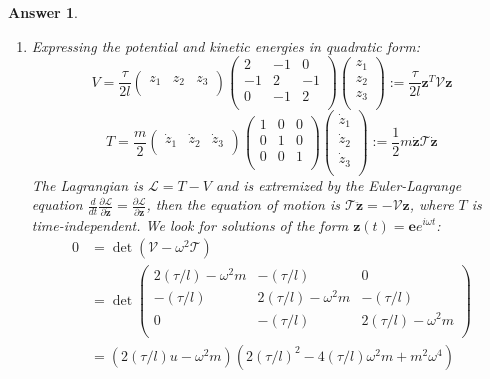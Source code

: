 \documentclass[a4paper]{article}
\newtheorem{ans}{Answer}[section]
\theoremstyle{new}
\begin{document}
\begin{ans}\leavevmode
\begin{enumerate}[label=(\roman*)]
\item Expressing the potential and kinetic energies in quadratic form:
$$V=\frac{\tau}{2l}\begin{pmatrix}z_1&z_2&z_3\\\end{pmatrix}\begin{pmatrix}2&-1&0\\-1&2&-1\\0&-1&2\\\end{pmatrix}\begin{pmatrix}z_1\\z_2\\z_3\\\end{pmatrix}:=\frac{\tau}{2l}\mathbf{z}^T\mathcal{V}\mathbf{z}$$
$$T=\frac{m}{2}\begin{pmatrix}\dot{z}_1&\dot{z}_2&\dot{z}_3\\\end{pmatrix}\begin{pmatrix}1&0&0\\0&1&0\\0&0&1\\\end{pmatrix}\begin{pmatrix}\dot{z}_1\\\dot{z}_2\\\dot{z}_3\\\end{pmatrix}:=\frac{1}{2}m\mathbf{\dot{z}}\mathcal{T}\mathbf{\dot{z}}$$
The Lagrangian is $\mathcal{L}=T-V$ and is extremized by the Euler-Lagrange equation $\frac{d}{dt}\frac{\partial\mathcal{L}}{\partial\mathbf{\dot{z}}}=\frac{\partial\mathcal{L}}{\partial\mathbf{z}}$, then the equation of motion is $\mathcal{T}\mathbf{\ddot{z}}=-\mathcal{V}\mathbf{z}$, where $T$ is time-independent. We look for solutions of the form $\mathbf{z}(t)=\mathbf{e}e^{i\omega t}$:
\begin{align}
0&=\det(\mathcal{V}-\omega^2\mathcal{T})\nonumber\\&=\det\begin{pmatrix}2(\tau/l)-\omega^2m&-(\tau/l)&0\\-(\tau/l)&2(\tau/l)-\omega^2m&-(\tau/l)\\0&-(\tau/l)&2(\tau/l)-\omega^2m\\\end{pmatrix}\nonumber\\&=(2(\tau/l)u-\omega^2m)(2(\tau/l)^2-4(\tau/l)\omega^2m+m^2\omega^4)\nonumber

\end{align}
\end{enumerate}
\end{ans}
\end{document}
